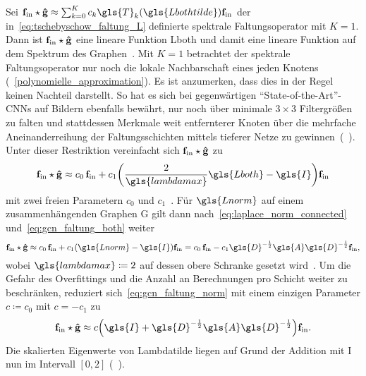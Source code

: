 Sei $\ve{f}_{\mathrm{in}} \star \ve{\hat g} \approx \sum_{k=0}^K c_k \gls{T}_k\left(\gls{Lbothtilde}\right) \ve{f}_{\mathrm{in}}$ der in~\eqref{eq:tschebyschow_faltung_L} definierte spektrale Faltungsoperator mit $K=1$.
Dann ist $\mathbf{f}_{\mathrm{in}} \star \mathbf{\hat g}$ eine lineare Funktion \bzgl{} \gls{Lboth} und damit eine lineare Funktion auf dem Spektrum des Graphen~\cite{gcn}.
Mit $K=1$ betrachtet der spektrale Faltungsoperator nur noch die lokale Nachbarschaft eines jeden Knotens (\vgl{}~\ref{polynomielle_approximation}).
Es ist anzumerken, dass dies in der Regel keinen Nachteil darstellt.
So hat es sich bei gegenwärtigen \enquote{State-of-the-Art}-\glspl{CNN} auf Bildern ebenfalls bewährt, nur noch über minimale $3\times3$ Filtergrößen zu falten und stattdessen Merkmale weit entfernterer Knoten über die mehrfache Aneinanderreihung der Faltungsschichten mittels tieferer Netze zu gewinnen~(\vgl{}~\cite{gcn, vgg, He}).
Unter dieser Restriktion vereinfacht sich $\mathbf{f}_{\mathrm{in}} \star \mathbf{\hat g}$ zu
\begin{equation}
  \ve{f}_{\mathrm{in}} \star \ve{\hat g} \approx c_0\, \ve{f}_{\mathrm{in}} + c_1 \left(\frac{2}{\gls{lambdamax}}\gls{Lboth} - \gls{I}\right)\ve{f}_{\mathrm{in}}
  \label{eq:gcn_faltung_both}
\end{equation}
mit zwei freien Parametern $c_0$ und $c_1$~\cite{gcn}.
Für $\gls{Lnorm}$ auf einem zusammenhängenden Graphen \gls{G} gilt dann nach~\eqref{eq:laplace_norm_connected} und~\eqref{eq:gcn_faltung_both} weiter
\begin{equation}
  \ve{f}_{\mathrm{in}} \star \ve{\hat g} \approx c_0 \, \ve{f}_{\mathrm{in}} + c_1 \left(\gls{Lnorm} - \gls{I}\right)\ve{f}_{\mathrm{in}} = c_0 \, \ve{f}_{\mathrm{in}} - c_1 \gls{D}^{-\frac{1}{2}} \gls{A} \gls{D}^{-\frac{1}{2}} \ve{f}_{\mathrm{in}},
  \label{eq:gcn_faltung_norm}
\end{equation}
wobei $\gls{lambdamax} \coloneqq 2$ auf dessen obere Schranke gesetzt wird~\cite{gcn}.
Um die Gefahr des Overfittings und die Anzahl an Berechnungen pro Schicht weiter zu beschränken, reduziert sich~\eqref{eq:gcn_faltung_norm} mit einem einzigen Parameter $c \coloneqq c_0$ mit $c = -c_1$ zu~\cite{gcn}
\begin{equation*}
  \ve{f}_{\mathrm{in}} \star \ve{\hat g} \approx c \left(\gls{I} + \gls{D}^{-\frac{1}{2}} \gls{A} \gls{D}^{-\frac{1}{2}} \right) \ve{f}_{\mathrm{in}}.
\end{equation*}
Die skalierten Eigenwerte von \gls{Lambdatilde} liegen auf Grund der Addition mit \gls{I} nun im Intervall $\left[0, 2\right]$ (\vgl{}~\cite{gcn}).
